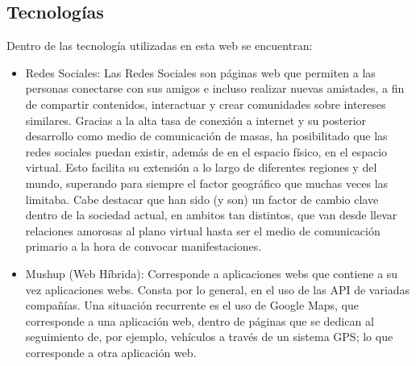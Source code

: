 \subsection{Tecnologías}
Dentro de las tecnología utilizadas en esta web se encuentran:

\begin{itemize}
 
 \item Redes Sociales: Las Redes Sociales son páginas web que permiten a las personas conectarse con 
  sus amigos e incluso realizar nuevas amistades, a fin de compartir contenidos, interactuar y crear 
  comunidades sobre intereses similares. Gracias a la alta tasa de conexión a internet y su posterior 
  desarrollo como medio de comunicación de masas, ha posibilitado que las redes sociales puedan existir, 
  además de en el espacio físico, en el espacio virtual. Esto facilita su extensión a lo largo de 
  diferentes regiones y del mundo, superando para siempre el factor geográfico que muchas veces las limitaba.
  Cabe destacar que han sido (y son) un factor de cambio clave dentro de la sociedad actual, en ambitos tan
  distintos, que van desde llevar relaciones amorosas al plano virtual hasta ser el medio de comunicación 
  primario a la hora de convocar manifestaciones.
 
 \item Mushup (Web Híbrida): Corresponde a aplicaciones webs que contiene a su vez aplicaciones webs. 
  Consta por lo general, en el uso de las API de variadas compañías. Una situación recurrente es el uso 
  de Google Maps,  que corresponde a una aplicación web, dentro de páginas que se dedican al seguimiento 
  de, por ejemplo, vehículos a través de un sistema GPS; lo que corresponde a otra aplicación web.
 

\end{itemize}
